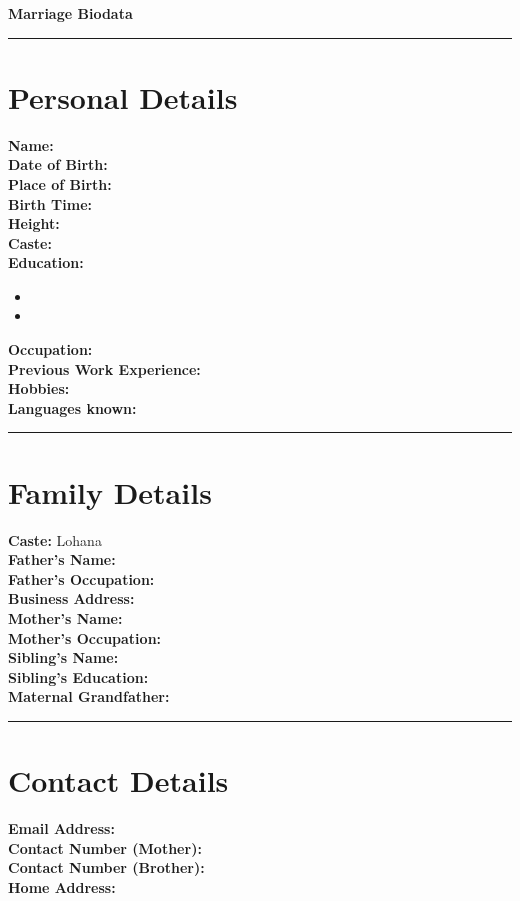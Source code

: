 \documentclass[a4paper,12pt]{article}
\begin{document}
\begin{center}
    {\Huge \textbf{Marriage Biodata}}\\[5pt]
    \textcolor{maroon}{\rule{\textwidth}{2pt}}
\end{center}

\vspace{10pt}
\section*{Personal Details}
\textbf{Name:} \\
\textbf{Date of Birth:} \\
\textbf{Place of Birth:} \\
\textbf{Birth Time:} \\
\textbf{Height:} \\
\textbf{Caste:} \\
\textbf{Education:}
\begin{itemize}
    \item  
    \item 
\end{itemize}
\textbf{Occupation:}  \\
\textbf{Previous Work Experience:} \\
\textbf{Hobbies:} \\
\textbf{Languages known:} 

\vspace{10pt}
\noindent\textcolor{maroon}{\rule{\textwidth}{2pt}}

\section*{Family Details}
\textbf{Caste:} Lohana\\
\textbf{Father's Name:} \\
\textbf{Father’s Occupation:} \\
\textbf{Business Address:} \\
\textbf{Mother’s Name:} \\
\textbf{Mother’s Occupation:} \\
\textbf{Sibling's Name:} \\
\textbf{Sibling's Education:}  \\
\textbf{Maternal Grandfather:} 


\vspace{10pt}
\noindent\textcolor{maroon}{\rule{\textwidth}{2pt}}

\section*{Contact Details}
\textbf{Email Address:} \\
\textbf{Contact Number (Mother):} \\
\textbf{Contact Number (Brother):} \\
\textbf{Home Address:} 
\end{document}
